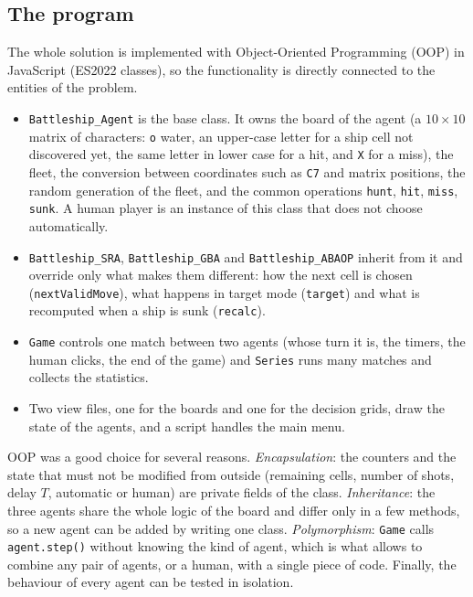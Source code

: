 \documentclass[letterpaper,11pt]{article} %
\begin{document}
\subsection{The program}

The whole solution is implemented with Object-Oriented Programming (OOP) in JavaScript (ES2022 classes), so the functionality is directly connected to the entities of the problem.

\begin{itemize}
    \item \texttt{Battleship\_Agent} is the base class. It owns the board of the agent (a $10\times10$ matrix of characters: \texttt{o} water, an upper-case letter for a ship cell not discovered yet, the same letter in lower case for a hit, and \texttt{X} for a miss), the fleet, the conversion between coordinates such as \texttt{C7} and matrix positions, the random generation of the fleet, and the common operations \texttt{hunt}, \texttt{hit}, \texttt{miss}, \texttt{sunk}. A human player is an instance of this class that does not choose automatically.
    \item \texttt{Battleship\_SRA}, \texttt{Battleship\_GBA} and \texttt{Battleship\_ABAOP} inherit from it and override only what makes them different: how the next cell is chosen (\texttt{nextValidMove}), what happens in target mode (\texttt{target}) and what is recomputed when a ship is sunk (\texttt{recalc}).
    \item \texttt{Game} controls one match between two agents (whose turn it is, the timers, the human clicks, the end of the game) and \texttt{Series} runs many matches and collects the statistics.
    \item Two view files, one for the boards and one for the decision grids, draw the state of the agents, and a script handles the main menu.
\end{itemize}

OOP was a good choice for several reasons.
\emph{Encapsulation}: the counters and the state that must not be modified from outside (remaining cells, number of shots, delay $T$, automatic or human) are private fields of the class.
\emph{Inheritance}: the three agents share the whole logic of the board and differ only in a few methods, so a new agent can be added by writing one class.
\emph{Polymorphism}: \texttt{Game} calls \texttt{agent.step()} without knowing the kind of agent, which is what allows to combine any pair of agents, or a human, with a single piece of code.
Finally, the behaviour of every agent can be tested in isolation.
\end{document}
